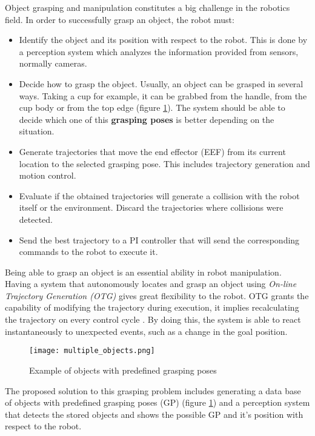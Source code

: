 Object grasping and manipulation  constitutes a big challenge in the robotics field. In order to successfully grasp an object, the robot must:
\begin{itemize}
	\item Identify the object and its position with respect to the robot. This is done by a perception system which analyzes the information provided from sensors, normally cameras.
	\item Decide how to grasp the object. Usually, an object can be grasped in several ways. Taking a cup for example, it can be grabbed from the handle, from the cup body or from the top edge (figure \ref{fig:obj_grasp_pose}). The system should be able to decide which one of this \textbf{grasping poses} is better depending on the situation.
	\item Generate trajectories that move the end effector (EEF) from its current location to the selected grasping pose. This includes trajectory generation and motion control.
	\item Evaluate if the obtained trajectories will generate a collision with the robot itself or the environment. Discard the trajectories where collisions were detected.
	\item Send the best trajectory to a PI controller that will send the corresponding commands to the robot to execute it.
\end{itemize}

Being able to grasp an object is an essential ability in robot manipulation. Having a system that autonomously locates and grasp an object using \textit{On-line Trajectory Generation (OTG)} gives great flexibility to the robot. OTG grants the capability of modifying the trajectory during execution, it implies recalculating the trajectory on every control cycle . By doing this, the system is able to react instantaneously to unexpected events, such as a change in the goal position.

\begin{figure}[H]
	\centering
	\texttt{[image: multiple\_objects.png]}
	\vspace{-10pt}
	\caption{Example of objects with predefined grasping poses}
	\vspace{-15pt}
	\label{fig:obj_grasp_pose}
\end{figure}

The proposed solution to this grasping problem includes generating a data base of objects with predefined grasping poses (GP) (figure \ref{fig:obj_grasp_pose}) and a perception system that detects the stored objects and shows the possible GP and it's position with respect to the robot.

